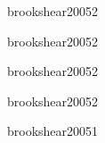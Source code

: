 \begin{syllabus}
\begin{unit}{\OSONEDef}{brookshear2005}{2}
\end{unit}

\begin{unit}{\NCONEDef}{brookshear2005}{2}

   \begin{topics}
      \item \NCONETopicHistoria
   \end{topics}

   \begin{unitgoals}
      \item \NCONEObjONE
      \item \NCONEObjTWO
   \end{unitgoals}

\end{unit}

\begin{unit}{\PLONEDef}{brookshear2005}{2}

   \begin{topics}
      \item \PLONETopicHistoria
      \item \PLONETopicBreve
   \end{topics}

   \begin{unitgoals}
      \item \PLONEObjONE
      \item \PLONEObjTWO
   \end{unitgoals}

\end{unit}

\begin{unit}{\PLTWODef}{brookshear2005}{2}

   \begin{topics}
      \item \PLTWOTopicEl
   \end{topics}

   \begin{unitgoals}
      \item \PLTWOObjONE
   \end{unitgoals}

\end{unit}

\begin{unit}{\PLSIXDef}{brookshear2005}{1}

   \begin{topics}
      \item \PLSIXTopicDiseno
      \item \PLSIXTopicClases
      \item \PLSIXTopicHerencia
      \item \PLSIXTopicPolimorfismo
   \end{topics}


\end{unit}
\end{syllabus}
